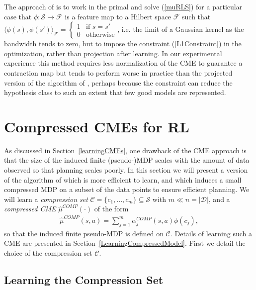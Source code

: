 \documentclass[letterpaper]{article}
\newcommand{\CsabaFLAM}{DBLP:conf/adprl/YaoSPZ14}
\newcommand{\GrunewalderEmbeddingsRL}{GrunewalderEmbeddingsMDP}
\newcommand{\cD}{{\mathcal D}}
\newcommand{\cC}{{\mathcal C}}
\newcommand{\cF}{{\mathcal F}}
\newcommand{\cS}{{\mathcal S}}
\newcommand{\lang}{\langle}
\newcommand{\rang}{\rangle}
\begin{document}
The approach of \cite{\CsabaFLAM} is to work in the primal and solve (\ref{muRLS}) for a particular case that $\phi:\cS\to\cF$ is a feature map to a Hilbert space $\cF$ such that $\lang\phi(s),\phi(s')\rang_{\cF} = \left\{ \begin{array}{ll} 1 & \mbox{if } s=s' \\ 0 & \mbox{otherwise} \end{array}\right.$, i.e. the limit of a Gaussian kernel as the bandwidth tends to zero, but to impose the constraint (\ref{L1Constraint}) in the optimization, rather than projection after learning. In our experimental experience this method requires less normalization of the CME to guarantee a contraction map but tends to perform worse in practice than the projected version of the algorithm of \cite{\GrunewalderEmbeddingsRL}, perhaps because the constraint can reduce the hypothesis class to such an extent that few good models are represented.

\section{Compressed CMEs for RL}  \label{Compression}

As discussed in Section~\ref{learningCMEs}, one drawback of the CME approach is that the size of the induced finite (pseudo-)MDP scales with the amount of data observed so that planning scales poorly. In this section we will present a version of the algorithm of \cite{\GrunewalderEmbeddingsRL} which is more efficient to learn, and which induces a small compressed MDP on a subset of the data points to ensure efficient planning. We will learn a \emph{compression set} $\cC = \{ c_1,...,c_m \}\subseteq \cS$  with $m\ll n = |\cD|$, and a \emph{compressed CME} $\hat\mu^{COMP}(\cdot)$ of the form
\begin{align}
\hat\mu^{COMP}(s,a) = \sum_{j=1}^m \alpha^{COMP}_j(s,a) \phi(c_j), \label{CompressedCME}
\end{align}
so that the induced finite pseudo-MDP is defined on $\cC$. Details of learning such a CME are presented in Section~\ref{LearningCompressedModel}. First we detail the choice of the compression set $\cC$.





\subsection{Learning the Compression Set} \label{learningCompression}
\end{document}
